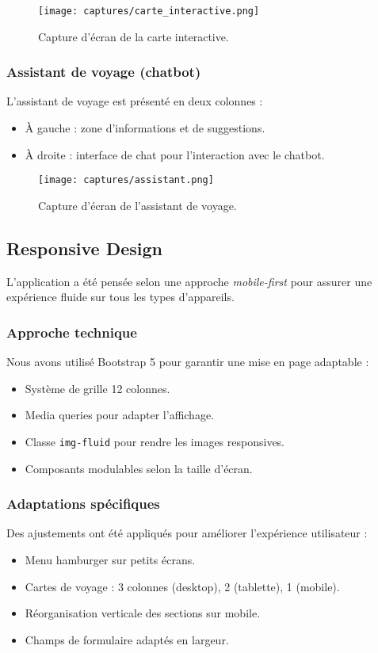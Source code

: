 \documentclass[a4paper,12pt]{article}
\begin{document}
\vspace{0.5cm}
\begin{figure}[H]
    \centering
    \texttt{[image: captures/carte\_interactive.png]}
    \caption{Capture d’écran de la carte interactive.}
\end{figure}

\subsubsection{Assistant de voyage (chatbot)}
L’assistant de voyage est présenté en deux colonnes :
\begin{itemize}
  \item À gauche : zone d’informations et de suggestions.
  \item À droite : interface de chat pour l’interaction avec le chatbot.
\end{itemize}

\vspace{0.5cm}
\begin{figure}[H]
    \centering
    \texttt{[image: captures/assistant.png]}
    \caption{Capture d’écran de l’assistant de voyage.}
\end{figure}

\subsection{Responsive Design}
L’application a été pensée selon une approche \textit{mobile-first} pour assurer une expérience fluide sur tous les types d'appareils.

\subsubsection{Approche technique}
Nous avons utilisé Bootstrap 5 pour garantir une mise en page adaptable :
\begin{itemize}
  \item Système de grille 12 colonnes.
  \item Media queries pour adapter l’affichage.
  \item Classe \texttt{img-fluid} pour rendre les images responsives.
  \item Composants modulables selon la taille d’écran.
\end{itemize}

\subsubsection{Adaptations spécifiques}
Des ajustements ont été appliqués pour améliorer l’expérience utilisateur :
\begin{itemize}
  \item Menu hamburger sur petits écrans.
  \item Cartes de voyage : 3 colonnes (desktop), 2 (tablette), 1 (mobile).
  \item Réorganisation verticale des sections sur mobile.
  \item Champs de formulaire adaptés en largeur.
\end{itemize}
\end{document}
